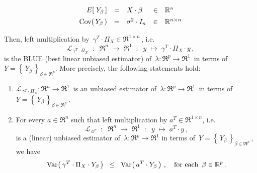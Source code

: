 \begin{theorem}
\begin{itemize}
\begin{equation*}
	\begin{array}{rclcl}
	E\!\left[\;Y_{\beta}\,\right] &  \overset{{\color{white}\vert}}{=} & X \cdot \beta & \in & \Re^{n}
	\\
	\Cov\!\left(\,Y_{\beta}\,\right) & \overset{{\color{white}\vert}}{=} & \sigma^{2} \cdot I_{n} & \in & \Re^{n \times n}
	\end{array}
	\end{equation*}
\end{itemize}
Then, left multiplication by \,$\gamma^{T} \cdot \Pi_{X} \in \Re^{1 \times n}$\,, i.e.
\begin{equation*}
\mathcal{L}_{\,\gamma^{T} \cdot \Pi_{X}}
\;\; : \;\;
\Re^{n} \; \longrightarrow \; \Re^{1}
\;\; : \;\;
y \; \longmapsto \; \gamma^{T} \cdot \Pi_{X} \cdot y\,,
\end{equation*}
is the BLUE (best linear unbiased estimator) of
\,$\lambda : \Re^{p} \longrightarrow \Re^{1}$\,
in terms of \,$Y = \left\{\,Y_{\beta}\,\right\}_{\beta\in\Re^{p}}$.
More precisely, the following statements hold:
\begin{enumerate}
\item
	$\mathcal{L}_{\,\gamma^{T} \cdot \Pi_{X}} : \Re^{n} \longrightarrow \Re^{1}$\,
	is an unbiased estimator of \,$\lambda : \Re^{p} \longrightarrow \Re^{1}$\,
	in terms of \,$Y = \left\{\,Y_{\beta}\,\right\}_{\beta\in\Re^{p}}$\,.
\item
	For every $a \in \Re^{n}$ such that left multiplication by $a^{T} \in \Re^{1 \times n}$, i.e.
	\begin{equation*}
	\mathcal{L}_{\,a^{T}}
	\;\; : \;\;
		\Re^{n} \; \longrightarrow \; \Re^{1}
	\;\; : \;\;
		y \; \longmapsto \; a^{T} \cdot y\,,
	\end{equation*}
	is a (linear) unbiased estimator of
	\,$\lambda : \Re^{p} \longrightarrow \Re^{1}$
	in terms of \,$Y = \left\{\,Y_{\beta}\,\right\}_{\beta\in\Re^{p}}$\,, we have
	\begin{equation*}
	\textnormal{Var}\!\left(\,\gamma^{T} \cdot \Pi_{X} \cdot Y_{\beta}\,\right)
	\;\; \leq \;\;
		\textnormal{Var}\!\left(\,a^{T} \cdot Y_{\beta}\,\right)\,,
	\quad
	\textnormal{for each \,$\beta \in \mathbb{R}^{p}$}\,.
	\end{equation*}
\end{enumerate}
\end{theorem}
\proof
